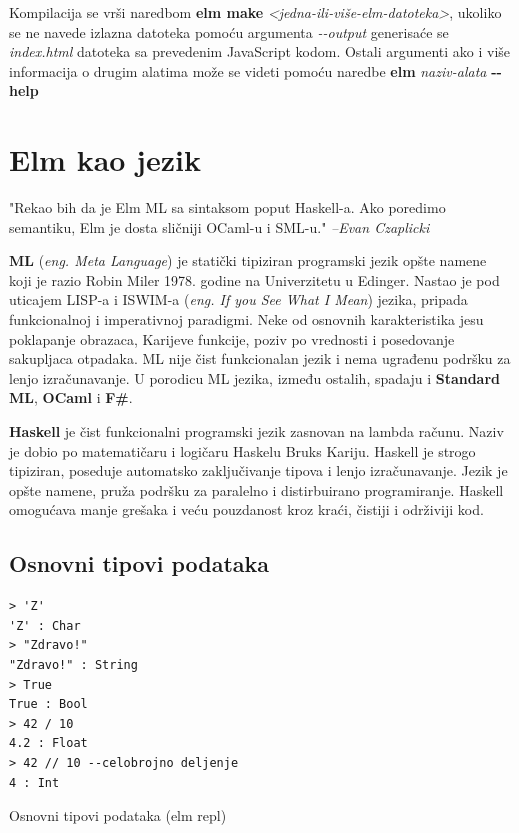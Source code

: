 \documentclass[12pt,oneside]{memoir}
\begin{document}
Kompilacija se vrši naredbom \textbf{elm make} \emph{<jedna-ili-više-elm-datoteka>},
ukoliko se ne navede izlazna datoteka pomoću argumenta \emph{-{}-output} generisaće 
se \emph{index.html} datoteka sa prevedenim JavaScript kodom. Ostali argumenti ako i
više informacija o drugim alatima može se videti pomoću naredbe \textbf{elm} \emph{naziv-alata} \textbf{-{}-help}

\section{Elm kao jezik}
\begin{displayquote}
"Rekao bih da je Elm ML sa sintaksom poput Haskell-a. Ako poredimo semantiku, Elm je
dosta  sličniji OCaml-u i SML-u." \emph{--Evan Czaplicki \cite{eczaplicki:2015}} 
\end{displayquote}

\textbf{ML} (\emph{eng. Meta Language}) je statički tipiziran programski jezik opšte namene koji je razio 
Robin Miler 1978. godine na Univerzitetu u Edinger. Nastao je pod uticajem LISP-a i ISWIM-a 
(\emph{eng. If you See What I Mean}) jezika, pripada funkcionalnoj i imperativnoj paradigmi. 
Neke od osnovnih karakteristika jesu poklapanje obrazaca, Karijeve funkcije, poziv po vrednosti i posedovanje 
sakupljaca otpadaka. ML nije čist funkcionalan jezik i nema ugrađenu podršku za lenjo izračunavanje. 
U porodicu ML jezika, između ostalih, spadaju i \textbf{Standard ML}, \textbf{OCaml} i \textbf{F{\#}}.


\textbf{Haskell} je čist funkcionalni programski jezik zasnovan na lambda računu.
Naziv je dobio po matematičaru i logičaru Haskelu Bruks Kariju. Haskell je strogo tipiziran, poseduje automatsko 
zaključivanje tipova i lenjo izračunavanje. Jezik je opšte namene, pruža podršku za paralelno i distirbuirano programiranje. 
Haskell omogućava manje grešaka i veću pouzdanost kroz kraći, čistiji i održiviji kod.


\subsection{Osnovni tipovi podataka}
\begin{listing}[ht]
\begin{verbatim}
> 'Z'
'Z' : Char
> "Zdravo!"
"Zdravo!" : String
> True
True : Bool
> 42 / 10 
4.2 : Float
> 42 // 10 --celobrojno deljenje
4 : Int
\end{verbatim}
\caption{Osnovni tipovi podataka (elm repl)}
\label{listing:tipovi}
\end{listing}
\end{document}
